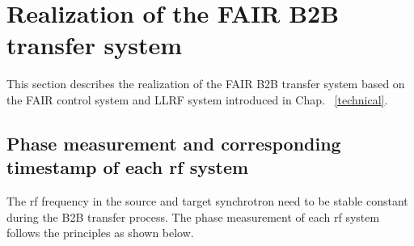 %
% 
\section{Realization of the FAIR B2B transfer system}
This section describes the realization of the FAIR B2B transfer system based on the FAIR control system and LLRF system introduced in Chap. ~\ref{technical}.
%
\subsection{Phase measurement and corresponding timestamp of each rf system}
The rf frequency in the source and target synchrotron need to be stable constant during the B2B transfer process. The phase measurement of each rf system follows the principles as shown below.

